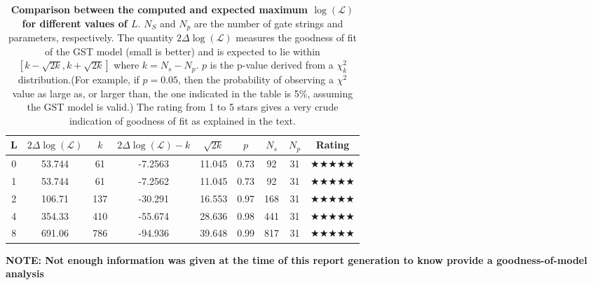 \documentclass{article}[11pt]
\begin{document}
{\begin{table}[h]
\begin{center}
\begin{tabular}[l]{|c|c|c|c|c|c|c|c|c|}
\hline
L & $2\Delta\log(\mathcal{L})$ & $k$ & $2\Delta\log(\mathcal{L})-k$ & $\sqrt{2k}$ & $p$ & $N_s$ & $N_p$ & Rating \\ \hline
0 & 53.744 & 61 & -7.2563 & 11.045 & 0.73 & 92 & 31 & $\bigstar\bigstar\bigstar\bigstar\bigstar$ \\ \hline
1 & 53.744 & 61 & -7.2562 & 11.045 & 0.73 & 92 & 31 & $\bigstar\bigstar\bigstar\bigstar\bigstar$ \\ \hline
2 & 106.71 & 137 & -30.291 & 16.553 & 0.97 & 168 & 31 & $\bigstar\bigstar\bigstar\bigstar\bigstar$ \\ \hline
4 & 354.33 & 410 & -55.674 & 28.636 & 0.98 & 441 & 31 & $\bigstar\bigstar\bigstar\bigstar\bigstar$ \\ \hline
8 & 691.06 & 786 & -94.936 & 39.648 & 0.99 & 817 & 31 & $\bigstar\bigstar\bigstar\bigstar\bigstar$ \\ \hline
\end{tabular}

\caption{\textbf{Comparison between the computed and expected maximum $\log(\mathcal{L})$ for different values of $L$}.  $N_S$ and $N_p$ are the number of gate strings and parameters, respectively.  The quantity $2\Delta\log(\mathcal{L})$ measures the goodness of fit of the GST model (small is better) and is expected to lie within $[k-\sqrt{2k},k+\sqrt{2k}]$ where $k = N_s-N_p$. $p$ is the p-value derived from a $\chi^2_k$ distribution.(For example, if $p=0.05$, then the probability of observing a $\chi^{2}$ value as large as, or larger than, the one indicated in the table is 5\%, assuming the GST model is valid.) The rating from 1 to 5 stars gives a very crude indication of goodness of fit as explained in the text.\label{progressTable}}
\end{center}
\end{table}

}{
\textbf{NOTE: Not enough information was given at the time of this report generation to know provide a goodness-of-model analysis}
}

\FloatBarrier
\end{document}
